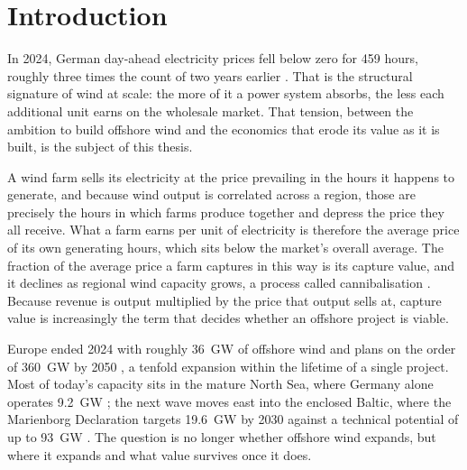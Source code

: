 
\section{Introduction}\label{sec:introduction}

In 2024, German day-ahead electricity prices fell below zero for 459 hours,
roughly three times the count of two years earlier
\cite{FfE2025_GermanElectricityPricesEPEX2024}. That is the structural
signature of wind at scale: the more of it a power system absorbs, the less each
additional unit earns on the wholesale market. That tension, between the ambition to build offshore wind and the
economics that erode its value as it is built, is the subject of this thesis.

A wind farm sells its electricity at the price prevailing in the hours it
happens to generate, and because wind output is correlated across a region,
those are precisely the hours in which farms produce together and depress the
price they all receive. What a farm earns per unit of electricity is therefore
the average price of its own generating hours, which sits below the market's
overall average. The fraction of the average price a farm captures in this way
is its capture value, and it declines as regional wind capacity grows, a
process called cannibalisation \cite{Hirth2013}. Because revenue is output
multiplied by the price that output sells at, capture value is increasingly
the term that decides whether an offshore project is viable.

Europe ended 2024 with roughly 36~GW of offshore wind
\cite{Colaluce2025_EuropeOffshoreWind} and plans on the order of 360~GW by 2050
\cite{EuropeanCommission2021_EUReferenceScenario2020}, a tenfold expansion
within the lifetime of a single project. Most of today's capacity
sits in the mature North Sea, where Germany alone operates 9.2~GW
\cite{OffshoreWIND2025_GermanyOffshoreCapacity}; the next wave moves east into the
enclosed Baltic, where the Marienborg Declaration targets 19.6~GW by 2030 against
a technical potential of up to 93~GW \cite{BalticWind2024_BEMIPOffshorePriorities}.
The question is no longer whether offshore wind expands, but where it
expands and what value survives once it does.

